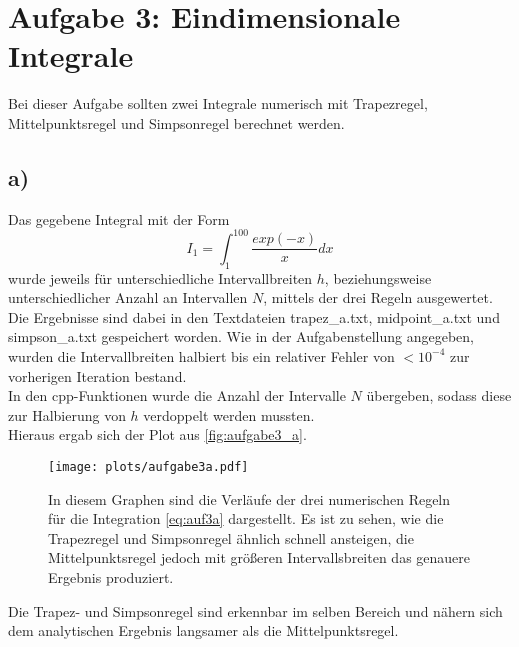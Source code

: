 \newpage
\section{Aufgabe 3: Eindimensionale Integrale}
\label{sec:auf3}

Bei dieser Aufgabe sollten zwei Integrale numerisch mit Trapezregel, Mittelpunktsregel und Simpsonregel berechnet werden.

\subsection{a)}
Das gegebene Integral mit der Form
\begin{equation}
    I_1 = \int_1^{100}\frac{exp(-x)}{x}dx
    \label{eq:auf3a}
\end{equation}
wurde jeweils für unterschiedliche Intervallbreiten $h$, beziehungsweise unterschiedlicher Anzahl an Intervallen $N$, mittels der drei Regeln ausgewertet.\\
Die Ergebnisse sind dabei in den Textdateien trapez\_a.txt, midpoint\_a.txt und simpson\_a.txt gespeichert worden.
Wie in der Aufgabenstellung angegeben, wurden die Intervallbreiten halbiert bis ein relativer Fehler von $<10^{-4}$ zur vorherigen Iteration bestand.\\
In den cpp-Funktionen wurde die Anzahl der Intervalle $N$ übergeben, sodass diese zur Halbierung von $h$ verdoppelt werden mussten.\\
Hieraus ergab sich der Plot aus \autoref{fig:aufgabe3_a}.
\begin{figure}
    \centering
    \texttt{[image: plots/aufgabe3a.pdf]}
    \caption{In diesem Graphen sind die Verläufe der drei numerischen Regeln für die Integration \ref{eq:auf3a} dargestellt.
    Es ist zu sehen, wie die Trapezregel und Simpsonregel ähnlich schnell ansteigen, die Mittelpunktsregel jedoch mit größeren Intervallsbreiten das genauere Ergebnis produziert.}
    \label{fig:aufgabe3_a}
\end{figure}
Die Trapez- und Simpsonregel sind erkennbar im selben Bereich und nähern sich dem analytischen Ergebnis langsamer als die Mittelpunktsregel.

